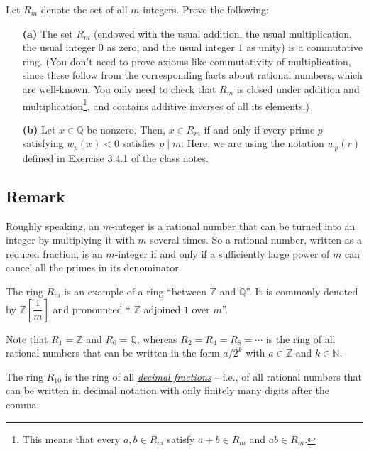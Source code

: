 \documentclass[paper=a4, fontsize=12pt]{scrartcl}%
\theoremstyle{plainsl}
\theoremstyle{definition}
\theoremstyle{remark}
\begin{document}
Let $R_{m}$ denote the set of all $m$-integers. Prove the following:

\begin{enumerate}
\item[\textbf{(a)}] The set $R_{m}$ (endowed with the usual addition, the
usual multiplication, the usual integer $0$ as zero, and the usual integer $1$
as unity) is a commutative ring. \newline(You don't need to prove axioms like
commutativity of multiplication, since these follow from the corresponding
facts about rational numbers, which are well-known. You only need to check
that $R_{m}$ is closed under addition and multiplication\footnote{This means
that every $a, b \in R_{m}$ satisfy $a + b \in R_{m}$ and $a b \in R_{m}$.},
and contains additive inverses of all its elements.)

\item[\textbf{(b)}] Let $x\in\mathbb{Q}$ be nonzero. Then, $x\in R_{m}$ if and
only if every prime $p$ satisfying $w_{p}\left(  x\right)  <0$ satisfies
$p\mid m$. Here, we are using the notation $w_{p}\left(  r\right)  $ defined
in Exercise 3.4.1 of the
\href{http://www.cip.ifi.lmu.de/~grinberg/t/19s/notes.pdf}{class notes}.
\end{enumerate}

\subsection{Remark}

Roughly speaking, an $m$-integer is a rational number that can be turned into
an integer by multiplying it with $m$ several times. So a rational number,
written as a reduced fraction, is an $m$-integer if and only if a sufficiently
large power of $m$ can cancel all the primes in its denominator.

The ring $R_{m}$ is an example of a ring \textquotedblleft between
$\mathbb{Z}$ and $\mathbb{Q}$\textquotedblright. It is commonly denoted by
$\mathbb{Z}\left[  \dfrac{1}{m}\right]  $ and pronounced \textquotedblleft%
$\mathbb{Z}$ adjoined $1$ over $m$\textquotedblright.

Note that $R_{1}=\mathbb{Z}$ and $R_{0}=\mathbb{Q}$, whereas $R_{2}%
=R_{4}=R_{8}=\cdots$ is the ring of all rational numbers that can be written
in the form $a/2^{k}$ with $a\in\mathbb{Z}$ and $k\in\mathbb{N}$.

The ring $R_{10}$ is the ring of all
\textit{\href{https://en.wikipedia.org/wiki/Decimal}{decimal fractions}} --
i.e., of all rational numbers that can be written in decimal notation with
only finitely many digits after the comma.
\end{document}

